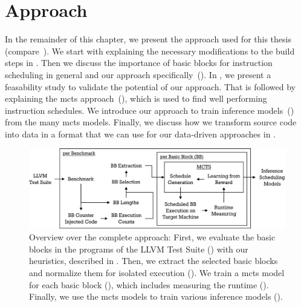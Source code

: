 \chapter{Approach}
\label{sec:approach}

In the remainder of this chapter, we present the approach used for this thesis (compare~).
We start with explaining the necessary modifications to the build steps in .
Then we discuss the importance of basic blocks for instruction scheduling in general and our approach specifically~().
In , we present a feasability study to validate the potential of our approach.
That is followed by explaining the \ac{mcts} approach~(), which is used to find well performing instruction schedules.
We introduce our approach to train inference models~() from the many \ac{mcts} models.
Finally, we discuss how we transform source code into data in a format that we can use for our data-driven approaches in .
\begin{figure}
    \centering
    \includegraphics[width=\textwidth]{img/ppt/approach_overview-crop.pdf}
    \caption[Overview Over the Approach]{Overview over the complete approach:
    First, we evaluate the basic blocks in the programs of the LLVM Test Suite () with our heuristics, described in .
    Then, we extract the selected basic blocks and normalize them for isolated execution ().
    We train a \ac{mcts} model for each basic block (), which includes measuring the runtime ().
    Finally, we use the \ac{mcts} models to train various inference models ().
    }
    \label{fig:approach:overview}
\end{figure}

